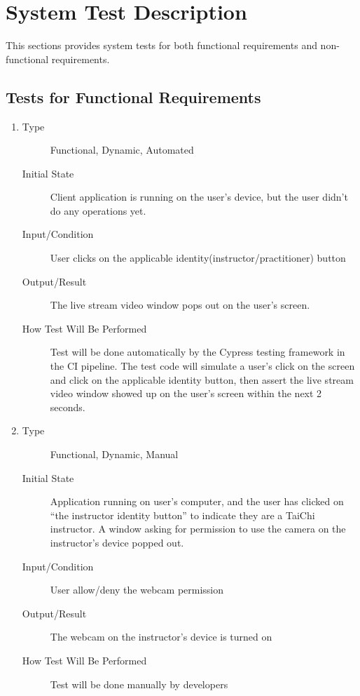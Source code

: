 \documentclass[12pt, titlepage]{article}
\begin{document}
\section{System Test Description}

This sections provides system tests for both functional requirements and
non-functional requirements.

\subsection{Tests for Functional Requirements}

\begin{enumerate}[FR-T1]
\item \label{FRT1}
  \begin{description}
  \item[Type] Functional, Dynamic, Automated
  \item[Initial State] Client application is running on the user's device, but the
    user didn’t do any operations yet.
  \item[Input/Condition] User clicks on the applicable
    identity(instructor/practitioner) button
  \item[Output/Result] The live stream video window pops out on the user's screen.
  \item[How Test Will Be Performed] Test will be done automatically by the Cypress
    testing framework in the CI pipeline. The test code will simulate a user's
    click on the screen and click on the applicable identity button, then assert
    the live stream video window showed up on the user's screen within the next
    2 seconds.
  \end{description}
\item \label{FRT2}
  \begin{description}
  \item[Type] Functional, Dynamic, Manual
  \item[Initial State] Application running on user’s computer, and the user has
    clicked on “the instructor identity button” to indicate they are a TaiChi
    instructor. A window asking for permission to use the camera on the
    instructor's device popped out.
  \item[Input/Condition] User allow/deny the webcam permission
  \item[Output/Result] The webcam on the instructor’s device is turned on
  \item[How Test Will Be Performed] Test will be done manually by developers

\end{description}
\end{enumerate}
\end{document}
